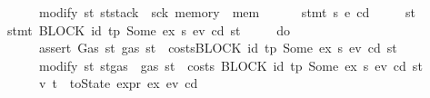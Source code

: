 \begin{isabellebody}
\ \ \ \ \ \ modify\ {\isacharparenleft}{\kern0pt}{\isasymlambda}st{\isachardot}{\kern0pt}\ st{\isasymlparr}stack\ {\isacharcolon}{\kern0pt}{\isacharequal}{\kern0pt}\ sck{\isacharprime}{\kern0pt}{\isacharcomma}{\kern0pt}\ memory\ {\isacharcolon}{\kern0pt}{\isacharequal}{\kern0pt}\ mem{\isacharprime}{\kern0pt}{\isasymrparr}{\isacharparenright}{\kern0pt}{\isacharsemicolon}{\kern0pt}\isanewline
\ \ \ \ \ \ stmt\ s\ e{\isacharprime}{\kern0pt}\ cd{\isacharprime}{\kern0pt}\isanewline
\ \ \ \ {\isacharbraceright}{\kern0pt}{\isacharparenright}{\kern0pt}\ st{\isachardoublequoteclose}\isanewline
{\isacharbar}{\kern0pt}\ {\isachardoublequoteopen}stmt\ {\isacharparenleft}{\kern0pt}BLOCK\ {\isacharparenleft}{\kern0pt}{\isacharparenleft}{\kern0pt}id{}{\isacharcomma}{\kern0pt}\ tp{\isacharparenright}{\kern0pt}{\isacharcomma}{\kern0pt}\ Some\ ex{\isacharprime}{\kern0pt}{\isacharparenright}{\kern0pt}\ s{\isacharparenright}{\kern0pt}\ e\isactrlsub v\ cd\ st\ {\isacharequal}{\kern0pt}\isanewline
\ \ \ \ {\isacharparenleft}{\kern0pt}do\ {\isacharbraceleft}{\kern0pt}\isanewline
\ \ \ \ \ \ assert\ Gas\ {\isacharparenleft}{\kern0pt}{\isasymlambda}st{\isachardot}{\kern0pt}\ gas\ st\ {\isachargreater}{\kern0pt}\ costs{\isacharparenleft}{\kern0pt}BLOCK\ {\isacharparenleft}{\kern0pt}{\isacharparenleft}{\kern0pt}id{}{\isacharcomma}{\kern0pt}\ tp{\isacharparenright}{\kern0pt}{\isacharcomma}{\kern0pt}\ Some\ ex{\isacharprime}{\kern0pt}{\isacharparenright}{\kern0pt}\ s{\isacharparenright}{\kern0pt}\ e\isactrlsub v\ cd\ st{\isacharparenright}{\kern0pt}{\isacharsemicolon}{\kern0pt}\isanewline
\ \ \ \ \ \ modify\ {\isacharparenleft}{\kern0pt}{\isasymlambda}st{\isachardot}{\kern0pt}\ st{\isasymlparr}gas\ {\isacharcolon}{\kern0pt}{\isacharequal}{\kern0pt}\ gas\ st\ {\isacharminus}{\kern0pt}\ costs\ {\isacharparenleft}{\kern0pt}BLOCK\ {\isacharparenleft}{\kern0pt}{\isacharparenleft}{\kern0pt}id{}{\isacharcomma}{\kern0pt}\ tp{\isacharparenright}{\kern0pt}{\isacharcomma}{\kern0pt}\ Some\ ex{\isacharprime}{\kern0pt}{\isacharparenright}{\kern0pt}\ s{\isacharparenright}{\kern0pt}\ e\isactrlsub v\ cd\ st{\isasymrparr}{\isacharparenright}{\kern0pt}{\isacharsemicolon}{\kern0pt}\isanewline
\ \ \ \ \ \ {\isacharparenleft}{\kern0pt}v{\isacharcomma}{\kern0pt}\ t{\isacharparenright}{\kern0pt}\ {\isasymleftarrow}\ toState\ {\isacharparenleft}{\kern0pt}expr\ ex{\isacharprime}{\kern0pt}\ e\isactrlsub v\ cd{\isacharparenright}{\kern0pt}{\isacharsemicolon}{\kern0pt}\isanewline

\end{isabellebody}
